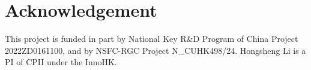 \section{Acknowledgement}\label{sec:ack}

This project is funded in part by National Key R\&D Program of China Project 2022ZD0161100, and by NSFC-RGC Project N\_CUHK498/24. 
%
Hongsheng Li is a PI of CPII under the InnoHK.